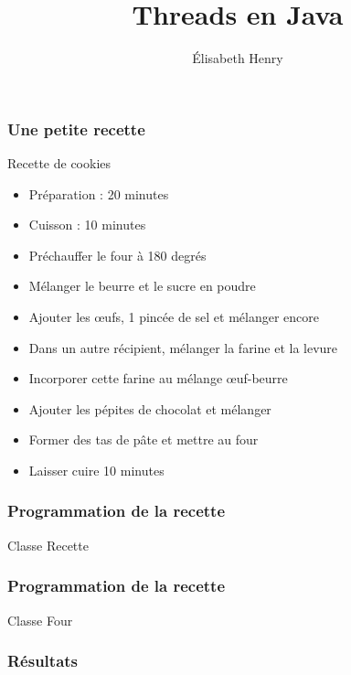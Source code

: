 \documentclass{beamer}
\author{Élisabeth Henry}
\title{Threads en Java}
\begin{document}
\begin{frame}
  \titlepage
\end{frame}


\begin{frame}
  \frametitle{Une petite recette}
  Recette de cookies
  \begin{itemize}
  \item Préparation : 20 minutes
  \item Cuisson : 10 minutes
  \end{itemize}
  \begin{itemize}
  \item Préchauffer le four à 180 degrés
  \item Mélanger le beurre et le sucre en poudre
  \item Ajouter les \oe ufs, 1 pincée de sel et mélanger encore
  \item Dans un autre récipient, mélanger la farine et la levure
  \item Incorporer cette farine au mélange \oe uf-beurre
  \item Ajouter les pépites de chocolat et mélanger
  \item Former des tas de pâte et mettre au four
  \item Laisser cuire 10 minutes
  \end{itemize}
\end{frame}

\begin{frame}
  \frametitle{Programmation de la recette}
Classe Recette

\end{frame}

\begin{frame}
  \frametitle{Programmation de la recette}
Classe Four

\end{frame}

\begin{frame}
  \frametitle{Résultats}

\end{frame}
\end{document}
